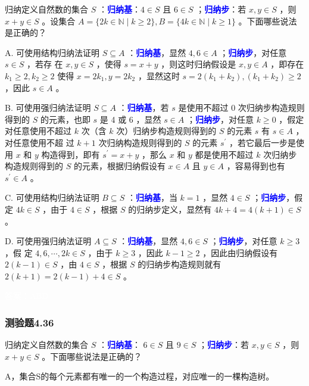 \documentclass[UTF8, heading=true]{ctexart}
\begin{document}
归纳定义自然数的集合 $S$ ：\textcolor{blue}{\textbf{归纳基}}：$4 \in S$ 且 $6 \in S$ ；\textcolor{blue}{\textbf{归纳步}}：若 $x, y \in S$ ，则 $x+y \in S$ 。设集合 $A=\{2 k \in \mathbb{N} \mid k \geq 2\}, B=\{4 k \in \mathbb{N} \mid k \geq 1\}$ 。下面哪些说法是正确的？

A. 可使用结构归纳法证明 $S \subseteq A$ ：\textcolor{blue}{\textbf{归纳基}}，显然 $4,6 \in A$ ；\textcolor{blue}{\textbf{归纳步}}，对任意 $s \in S$ ，若存
在 $x, y \in S$ ，使得 $s=x+y$ ，则这时归纳假设是 $x, y \in A$ ，即存在 $k_1 \geq 2, k_2 \geq 2$ 使得 $x=2 k_1, y=2 k_2$ ，显然这时 $s=2\left(k_1+k_2\right),\left(k_1+k_2\right) \geq 2$ ，因此 $s \in A$ 。

B. 可使用强归纳法证明 $S \subseteq A$ ：\textcolor{blue}{\textbf{归纳基}}，若 $s$ 是使用不超过 0 次归纳步构造规则得到的 $S$ 的元素，也即 $s$ 是 4 或 6 ，显然 $s \in A$ ；\textcolor{blue}{\textbf{归纳步}}，对任意 $k \geq 0$ ，假定对任意使用不超过 $k$ 次（含 $k$ 次）归纳步构造规则得到的 $S$ 的元素 $s$ 有 $s \in A$ ，对任意使用不超
过 $k+1$ 次归纳构造规则得到的 $S$ 的元素 $s^{\prime}$ ，若它最后一步是使用 $x$ 和 $y$ 构造得到，即有 $s^{\prime}=x+y$ ，那么 $x$ 和 $y$ 都是使用不超过 $k$ 次归纳步构造规则得到的 $S$ 的元素，根据归纳假设有 $x \in A$ 且 $y \in A$ ，容易得到也有 $s^{\prime} \in A$ 。

C. 可使用结构归纳法证明 $B \subseteq S$ ：\textcolor{blue}{\textbf{归纳基}}，当 $k=1$ ，显然 $4 \in S$ ；\textcolor{blue}{\textbf{归纳步}}，假定 $4 k \in S$ ，由于 $4 \in S$ ，根据 $S$ 的归纳步定义，显然有 $4 k+4=4(k+1) \in S$ 。

D. 可使用强归纳法证明 $A \subseteq S$ ：\textcolor{blue}{\textbf{归纳基}}，显然 $4,6 \in S$ ；\textcolor{blue}{\textbf{归纳步}}，对任意 $k \geq 3$ ，假
定 $4,6, \cdots, 2 k \in S$ ，由于 $k \geq 3$ ，因此 $k-1 \geq 2$ ，因此由归纳假设有 $2(k-1) \in S$ ，由 $4 \in S$ ，根据 $S$ 的归纳步构造规则就有 $2(k+1)=2(k-1)+4 \in S$ 。

\textcolor{white}{答案：ABD}

\subsubsection{测验题4.36}

归纳定义自然数的集合 $S$ ：\textcolor{blue}{\textbf{归纳基}}： $6 \in S$ 且 $9 \in S$ ；\textcolor{blue}{\textbf{归纳步}}：若 $x, y \in S$ ，则 $x+y \in S$ 。下面哪些说法是正确的？

A，集合S的每个元素都有唯一的一个构造过程，对应唯一的一棵构造树。
\end{document}

